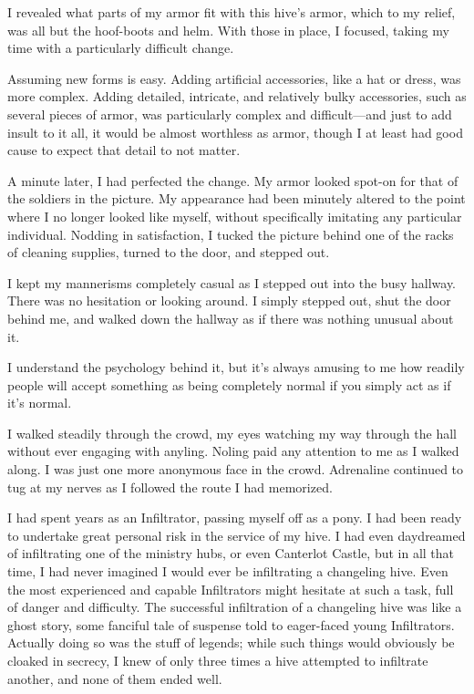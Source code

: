 I revealed what parts of my armor fit with this hive’s armor, which to my relief, was all but the hoof-boots and helm. With those in place, I focused, taking my time with a particularly difficult change.

Assuming new forms is easy. Adding artificial accessories, like a hat or dress, was more complex. Adding detailed, intricate, and relatively bulky accessories, such as several pieces of armor, was particularly complex and difficult—and just to add insult to it all, it would be almost worthless as armor, though I at least had good cause to expect that detail to not matter.

A minute later, I had perfected the change. My armor looked spot-on for that of the soldiers in the picture. My appearance had been minutely altered to the point where I no longer looked like myself, without specifically imitating any particular individual. Nodding in satisfaction, I tucked the picture behind one of the racks of cleaning supplies, turned to the door, and stepped out.

I kept my mannerisms completely casual as I stepped out into the busy hallway. There was no hesitation or looking around. I simply stepped out, shut the door behind me, and walked down the hallway as if there was nothing unusual about it.

I understand the psychology behind it, but it’s always amusing to me how readily people will accept something as being completely normal if you simply act as if it’s normal.

I walked steadily through the crowd, my eyes watching my way through the hall without ever engaging with anyling. Noling paid any attention to me as I walked along. I was just one more anonymous face in the crowd. Adrenaline continued to tug at my nerves as I followed the route I had memorized.

I had spent years as an Infiltrator, passing myself off as a pony. I had been ready to undertake great personal risk in the service of my hive. I had even daydreamed of infiltrating one of the ministry hubs, or even Canterlot Castle, but in all that time, I had never imagined I would ever be infiltrating a changeling hive. Even the most experienced and capable Infiltrators might hesitate at such a task, full of danger and difficulty. The successful infiltration of a changeling hive was like a ghost story, some fanciful tale of suspense told to eager-faced young Infiltrators. Actually doing so was the stuff of legends; while such things would obviously be cloaked in secrecy, I knew of only three times a hive attempted to infiltrate another, and none of them ended well.

